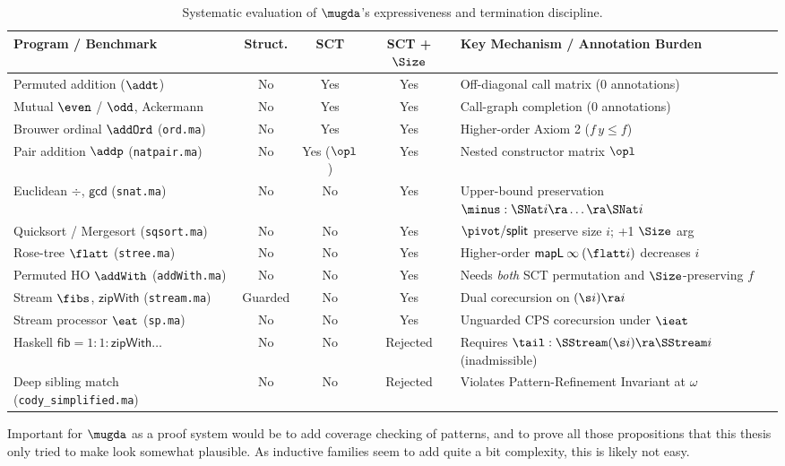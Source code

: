 \begin{table}[htp]
\centering
\footnotesize
\begin{tabular}{|l|c|c|c|l|}
\hline
\textbf{Program / Benchmark} & \textbf{Struct.} & \textbf{SCT} & \textbf{SCT + $\Size$} & \textbf{Key Mechanism / Annotation Burden} \\
\hline
Permuted addition ($\addt$) & No & Yes & Yes & Off-diagonal call matrix (0 annotations) \\
Mutual $\even$ / $\odd$, Ackermann & No & Yes & Yes & Call-graph completion (0 annotations) \\
Brouwer ordinal $\addOrd$ (\texttt{ord.ma}) & No & Yes & Yes & Higher-order Axiom 2 ($f\,y \leq f$) \\
Pair addition $\addp$ (\texttt{natpair.ma}) & No & Yes ($\opl$) & Yes & Nested constructor matrix $\opl$ \\
Euclidean $\div$, $\mathsf{gcd}$ (\texttt{snat.ma}) & No & No & Yes & Upper-bound preservation $\minus : \SNat i \ra \dots \ra \SNat i$ \\
Quicksort / Mergesort (\texttt{sqsort.ma}) & No & No & Yes & $\pivot / \mathsf{split}$ preserve size $i$; +1 $\Size$ arg \\
Rose-tree $\flatt$ (\texttt{stree.ma}) & No & No & Yes & Higher-order $\mathsf{mapL}\:\infty\:(\flatt i)$ decreases $i$ \\
Permuted HO $\addWith$ (\texttt{addWith.ma}) & No & No & Yes & Needs \emph{both} SCT permutation and $\Size$-preserving $f$ \\
Stream $\fibs$, $\mathsf{zipWith}$ (\texttt{stream.ma}) & Guarded & No & Yes & Dual corecursion on $(\s i) \ra i$ \\
Stream processor $\eat$ (\texttt{sp.ma}) & No & No & Yes & Unguarded CPS corecursion under $\ieat$ \\
Haskell $\mathsf{fib} = 1:1:\mathsf{zipWith}\dots$ & No & No & Rejected & Requires $\tail : \SStream (\s i) \ra \SStream i$ (inadmissible) \\
Deep sibling match (\texttt{cody\_simplified.ma}) & No & No & Rejected & Violates Pattern-Refinement Invariant at $\omega$ \\
\hline
\end{tabular}
\caption{Systematic evaluation of $\mugda$'s expressiveness and termination discipline.}
\label{tab:eval}
\end{table}

Important for $\mugda$ as a proof system would be to add coverage checking of patterns, and to prove all those propositions that this thesis only tried to make look somewhat plausible. As inductive families seem to add quite a bit complexity, this is likely not easy.


